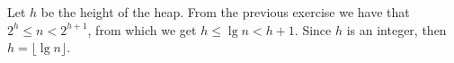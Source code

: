 Let $h$ be the height of the heap.
From the previous exercise we have that $2^h\le n<2^{h+1}$, from which we get $h\le\lg n<h+1$.
Since $h$ is an integer, then $h=\lfloor\lg n\rfloor$.
